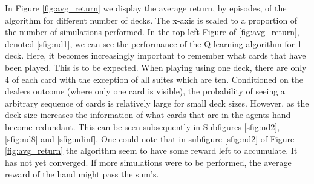 In Figure \ref{fig:avg_return} we display the average return, by episodes, of the algorithm for different number of decks. 
The x-axis is scaled to a proportion of the number of simulations performed. In the top left Figure of \ref{fig:avg_return}, 
denoted \ref{sfig:nd1}, we can see the performance of the Q-learning algorithm for 1 deck. 
Here, it becomes increasingly important to remember what cards that have been played. This is to be expected.
When playing using one deck, there are only 4 of each card with the exception of all suites which are ten. 
Conditioned on the dealers outcome (where only one card is visible), the probability of seeing a arbitrary sequence of 
cards is relatively large for small deck sizes. However, as the deck size increases the information of what cards that 
are in the agents hand become redundant. This can be seen subsequently in Subfigures \ref{sfig:nd2}, \ref{sfig:nd8} and 
\ref{sfig:ndinf}. One could note that in subfigure \ref{sfig:nd2} of Figure \ref{fig:avg_return} the algorithm seem to 
have some reward left to accumulate. It has not yet converged. If more simulations were to be performed, 
the average reward of the hand might pass the sum's. 
